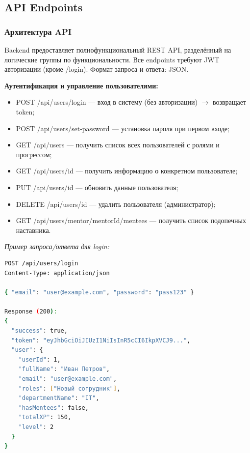 \subsection{API Endpoints}

\subsubsection{Архитектура API}

Backend предоставляет полнофункциональный REST API, разделённый на логические группы по функциональности. Все endpoints требуют JWT авторизации (кроме /login). Формат запроса и ответа: JSON.

\textbf{Аутентификация и управление пользователями:}
\begin{itemize}
    \item POST /api/users/login --- вход в систему (без авторизации) $\to$ возвращает token;
    \item POST /api/users/set-password --- установка пароля при первом входе;
    \item GET /api/users --- получить список всех пользователей с ролями и прогрессом;
    \item GET /api/users/{id} --- получить информацию о конкретном пользователе;
    \item PUT /api/users/{id} --- обновить данные пользователя;
    \item DELETE /api/users/{id} --- удалить пользователя (администратор);
    \item GET /api/users/mentor/{mentorId}/mentees --- получить список подопечных наставника.
\end{itemize}

\textit{Пример запроса/ответа для login:}
\begin{lstlisting}[language=bash, basicstyle=\ttfamily\small]
POST /api/users/login
Content-Type: application/json

{ "email": "user@example.com", "password": "pass123" }

Response (200):
{
  "success": true,
  "token": "eyJhbGciOiJIUzI1NiIsInR5cCI6IkpXVCJ9...",
  "user": {
    "userId": 1,
    "fullName": "Иван Петров",
    "email": "user@example.com",
    "roles": ["Новый сотрудник"],
    "departmentName": "IT",
    "hasMentees": false,
    "totalXP": 150,
    "level": 2
  }
}
\end{lstlisting}

